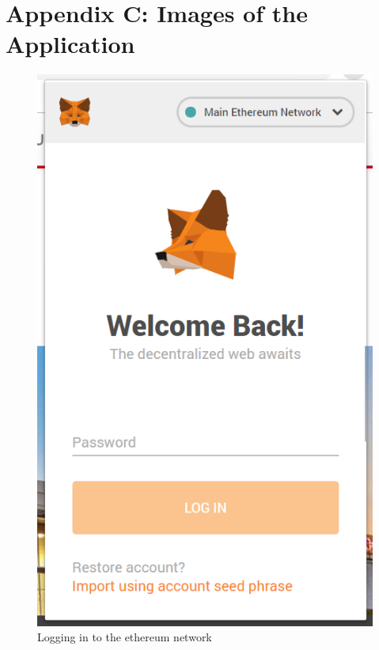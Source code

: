 \section{Appendix C: Images of the Application}
\begin{figure}[H]
\center
\includegraphics[scale=0.6]{images/metamasklogin.png}
\caption{Logging in to the ethereum network}
\end{figure}

